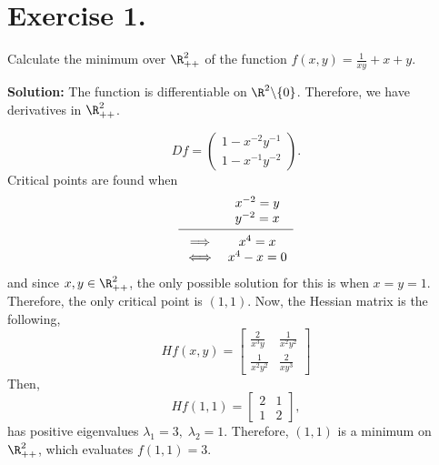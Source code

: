 \section*{Exercise 1.}

Calculate the minimum over $\R^2_{++}$ of the function $f(x,y) = \frac{1}{xy} + x + y$.

\textbf{Solution:} The function is differentiable on $\R^{2}\backslash\{0\}$. Therefore, we have derivatives in $\R^{2}_{++}$.

\[ Df = \left( \begin{array}{c}
    1-x^{-2}y^{-1}\\
    1-x^{-1}y^{-2}
\end{array} \right). \]
Critical points are found when
\[ \begin{array}{cc}
    &x^{-2} = y\\
    &y^{-2} = x\\[0.2em]\hline\\[-0.8em]
    \implies& x^4 = x\\
    \iff& x^4-x = 0
\end{array} \]
and since $x,y\in \R^{2}_{++}$, the only possible solution for this is when $x = y = 1$. Therefore, the only critical point is $(1,1)$. Now, the Hessian matrix is the following,
\[ Hf (x,y) = \left[ \begin{matrix}
    \frac{2}{x^3 y} & \frac{1}{x^2 y^2}\\
    \frac{1}{x^2 y^2} & \frac{2}{xy^3}
\end{matrix} \right] \]
Then,
\[ Hf (1,1) = \left[ \begin{matrix}
    2 & 1\\
    1 & 2
\end{matrix} \right], \]
has positive eigenvalues $\lambda_1 =3,\; \lambda_2 = 1$. Therefore, $(1,1)$ is a minimum on $\R_{++}^2$, which evaluates $f(1,1) = 3$.